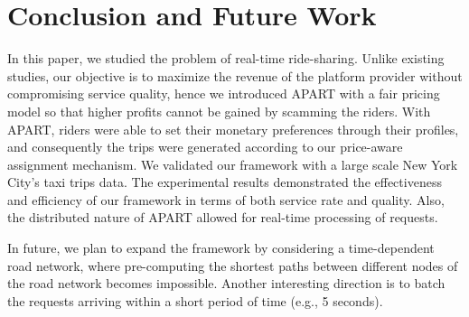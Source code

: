 \section{Conclusion and Future Work}
\label{sec:conclusion}

In this paper, we studied the problem of real-time ride-sharing. Unlike existing studies, our objective is to maximize the revenue of the platform provider without compromising service quality, hence we introduced APART with a fair pricing model so that higher profits cannot be gained by scamming the riders. With APART, riders were able to set their monetary preferences through their profiles, and consequently the trips were generated according to our price-aware assignment mechanism. We validated our framework with a large scale New York City's taxi trips data. The experimental results demonstrated the effectiveness and efficiency of our framework in terms of both service rate and quality. Also, the distributed nature of APART allowed for real-time processing of requests.

In future, we plan to expand the framework by considering a time-dependent road network, where pre-computing the shortest paths between different nodes of the road network becomes impossible. Another interesting direction is to batch the requests arriving within a short period of time (e.g., 5 seconds). 
\vspace{-0.1in}
